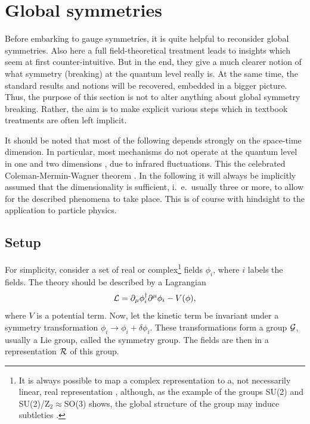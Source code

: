 \documentclass[final,12pt]{article}
\newcommand*{\La}{{\cal{L}}}
\newcommand*{\no}{\noindent}
\newcommand*{\be}{\begin{equation}}
\newcommand*{\ee}{\end{equation}}
\newcommand*{\pd}{\partial}
\newcommand*{\pdm}{\pd_{\mu}}
\newcommand*{\1}{1\!\!\!\bot}
\begin{document}
\section{Global symmetries}\label{s:global}

Before embarking to gauge symmetries, it is quite helpful to reconsider global symmetries. Also here a full field-theoretical treatment \cite{Strocchi:2015uaa} leads to insights which seem at first counter-intuitive. But in the end, they give a much clearer notion of what symmetry (breaking) at the quantum level really is. At the same time, the standard results and notions will be recovered, embedded in a bigger picture. Thus, the purpose of this section is not to alter anything about global symmetry breaking. Rather, the aim is to make explicit various steps which in textbook treatments are often left implicit.

It should be noted that most of the following depends strongly on the space-time dimension. In particular, most mechanisms do not operate at the quantum level in one and two dimensions \cite{Frohlich:1978px,Strocchi:2015uaa}, due to infrared fluctuations. This the celebrated Coleman-Mermin-Wagner theorem \cite{Strocchi:2015uaa,Mermin:1966fe,Coleman:1973ci}. In the following it will always be implicitly assumed that the dimensionality is sufficient, i.\ e.\ usually three or more, to allow for the described phenomena to take place. This is of course with hindsight to the application to particle physics.

\subsection{Setup}

For simplicity, consider a set of real or complex\footnote{It is always possible to map a complex representation to a, not necessarily linear, real representation \cite{Bohm:2001yx,O'Raifeartaigh:1978kv,Sartori:1992ib}, although, as the example of the groups SU(2) and SU(2)/Z$_2\approx$SO(3) shows, the global structure of the group may induce subtleties \cite{O'Raifeartaigh:1978kv,Heissenberg:2015tji}.} fields $\phi_i$, where $i$ labels the fields. The theory should be described by a Lagrangian
\be
\La=\pdm\phi^\dagger_i\pd^\mu\phi_i-V(\phi)\label{linsig},
\ee
\no where $V$ is a potential term. Now, let the kinetic term be invariant under a symmetry transformation $\phi_i\to\phi_i+\delta\phi_i$. These transformations form a group ${\cal G}$, usually a Lie group, called the symmetry group. The fields are then in a representation ${\cal R}$ of this group.
\end{document}
